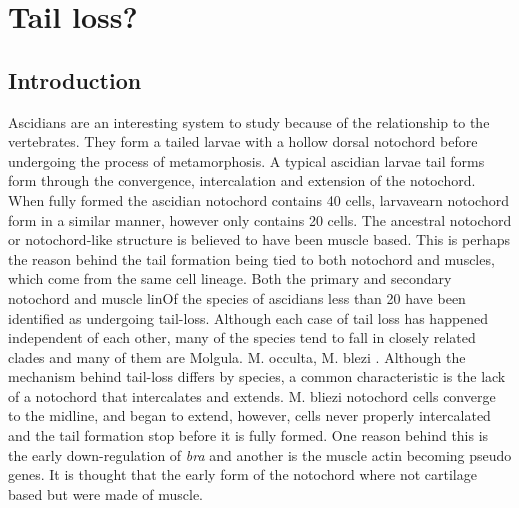 \chapter{Tail loss?}

\section{Introduction}


Ascidians are an interesting system to study because of the relationship to the vertebrates. They form a tailed larvae with a hollow dorsal notochord before undergoing the process of metamorphosis. A typical ascidian larvae tail forms form through the convergence, intercalation and extension of the notochord. When fully formed the ascidian notochord contains 40 cells, larvavearn notochord form in a similar manner, however only contains 20 cells. The ancestral notochord or notochord-like structure is believed to have been muscle based. This is perhaps the reason behind the tail formation being tied to both notochord and muscles, which come from the same cell lineage. Both the primary and secondary notochord and muscle linOf the  species of ascidians less than 20 have been identified as undergoing tail-loss. Although each case of tail loss has happened independent of each other, many of the species tend to fall in closely related clades and many of them are Molgula. M. occulta, M. blezi . Although the mechanism behind tail-loss differs by species, a common characteristic is the lack of a notochord that intercalates and extends. M. bliezi notochord cells converge to the midline, and began to extend, however, cells never properly intercalated and the tail formation stop before it is fully formed. One reason behind this is the early down-regulation of \textit{bra} and another is the muscle actin becoming pseudo genes. It is thought that the early form of the notochord where not cartilage based but were made of muscle.  


